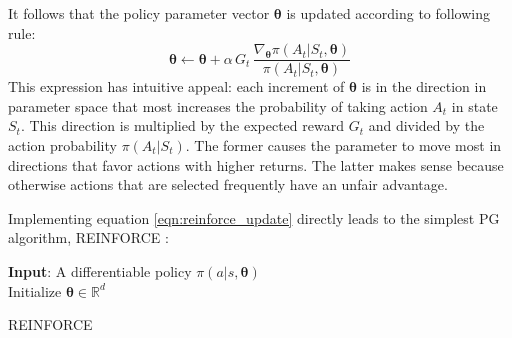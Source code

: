 It follows that the policy parameter vector $\bm{\theta}$ is updated according to following rule:
\begin{equation}
    \bm{\theta} \leftarrow \bm{\theta} + \alpha \, G_t \, \frac{\nabla_{\bm{\theta}} \pi(A_t|S_t, \bm{\theta})}{\pi(A_t|S_t, \bm{\theta})}
    \label{eqn:reinforce_update}
\end{equation}
This expression has intuitive appeal: each increment of $\bm{\theta}$ is in the direction in parameter space that most increases the probability of taking action $A_t$ in state $S_t$. This direction is multiplied by the expected reward $G_t$ and divided by the action probability $\pi(A_t|S_t)$. The former causes the parameter to move most in directions that favor actions with higher returns. The latter makes sense because otherwise actions that are selected frequently have an unfair advantage.


Implementing equation \ref{eqn:reinforce_update} directly leads to the simplest PG algorithm, REINFORCE \cite{williams1992reinforce}:

\begin{algorithm}[H]
\SetAlgoLined
\textbf{Input}: A differentiable policy $\pi(a|s, \bm{\theta})$\\
Initialize $\bm{\theta} \in \mathbb{R}^d$\\
 \caption{REINFORCE}
 \label{algo:reinforce}
\end{algorithm}

